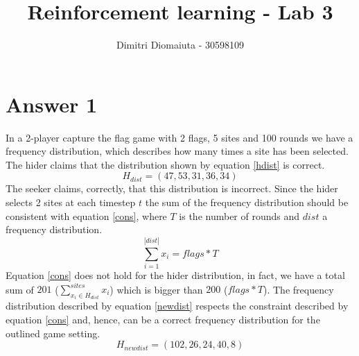 \documentclass[runningheads]{llncs}
\begin{document}
%
\title{Reinforcement learning - Lab 3}
%
%
\author{Dimitri Diomaiuta - 30598109}
%
%
%
\maketitle              %
%
%
%
%

\section{Answer 1}
In a 2-player capture the flag game with 2 flags, 5 sites and 100
rounds we have a frequency distribution, which describes how many
times a site has been selected. The hider claims that the distribution
shown by equation \ref{hdist} is correct.
\begin{equation}\label{hdist}
H_{dist} = (47, 53, 31, 36, 34)
\end{equation}
The seeker claims, correctly, that this distribution is
incorrect. Since the hider selects 2 sites at each timestep $t$ the
sum of the frequency distribution should be consistent with equation
\ref{cons}, where $T$ is the number of rounds and $dist$ a frequency distribution.
\begin{equation}\label{cons}
  \sum_{i = 1}^{|dist|}x_i = flags * T
\end{equation}
Equation \ref{cons} does not hold for the hider distribution, in fact,
we have a total sum of $201$ ($\sum_{x_i \in H_{dist}}^{sites}x_i$)
which is bigger than $200$ ($flags * T$). The frequency distribution
described by equation \ref{newdist} respects the constraint described
by equation \ref{cons} and, hence, can be a correct frequency
distribution for the outlined game setting.
\begin{equation}\label{newdist}
  H_{newdist} = (102, 26, 24, 40, 8)
\end{equation}
\end{document}
